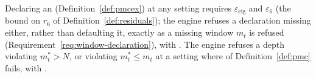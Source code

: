 
\begin{requirement}
\label{req:exact-window-declaration}
Declaring an  (Definition~\ref{def:pmcex}) at any
setting requires $\varepsilon_{\mathrm{eig}}$ and $\varepsilon_6$ (the bound
on $r_6$ of Definition~\ref{def:residuals}); the engine refuses a
declaration missing either, rather than defaulting it, exactly as a missing
window $m_t$ is refused (Requirement~\ref{req:window-declaration}), with
. The engine refuses
a depth violating $m^{\ast}_t>N$, or violating $m^{\ast}_t\le m_t$ at a
setting where  of Definition~\ref{def:pmc} fails, with
.
\end{requirement}
